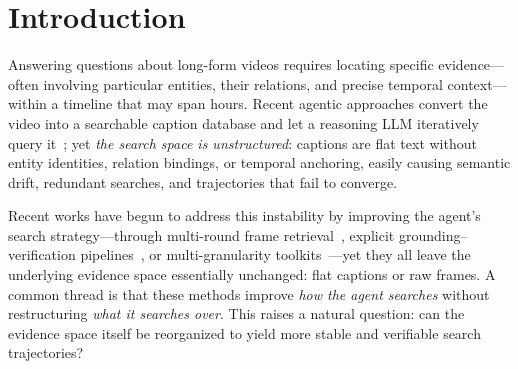 \documentclass[sigconf, screen, review, anonymous]{acmart}
\begin{document}


\maketitle


\section{Introduction}
\label{sec:intro}


Answering questions about long-form videos requires locating specific
evidence---often involving particular entities, their relations, and
precise temporal context---within a timeline that may span hours.  Recent
agentic approaches convert the video into a searchable caption database
and let a reasoning LLM iteratively query
it~\cite{dvd,videoagent,videoseek}; yet \emph{the search space is
unstructured}: captions are flat text without entity identities, relation
bindings, or temporal anchoring, easily causing semantic drift, redundant
searches, and trajectories that fail to converge.


Recent works have begun to address this instability by improving the
agent's search strategy---through multi-round frame
retrieval~\cite{videoagent}, explicit grounding--verification
pipelines~\cite{videomind}, or multi-granularity
toolkits~\cite{videoseek}---yet they all leave the underlying evidence
space essentially unchanged: flat captions or raw frames.  A common thread
is that these methods improve \emph{how the agent searches} without
restructuring \emph{what it searches over}.  This raises a natural
question: can the evidence space itself be reorganized to yield more
stable and verifiable search trajectories?

\end{document}
